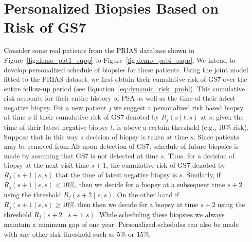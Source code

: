 \section{Personalized Biopsies Based on Risk of GS7}
Consider some real patients from the PRIAS database shown in Figure~\ref{fig:demo_pat1_supp} to Figure~\ref{fig:demo_pat4_supp}. We intend to develop personalized schedule of biopsies for these patients. Using the joint model fitted to the PRIAS dataset, we first obtain their cumulative risk of GS7 over the entire follow-up period (see Equation~\ref{eq:dynamic_risk_prob}). This cumulative risk accounts for their entire history of PSA as well as the time of their latest negative biopsy. For a new patient $j$ we suggest a personalized risk based biopsy at time $s$ if their cumulative risk of GS7 denoted by $R_j(s \mid t, s)$ at $s$, given the time of their latest negative biopsy $t$, is above a certain threshold (e.g., 10\% risk). Suppose that in this way a decision of biopsy is taken at time $s$. Since patients may be removed from AS upon detection of GS7, schedule of future biopsies is made by assuming that GS7 is not detected at time $s$. Thus, for a decision of biopsy at the next visit time $s + 1$, the cumulative risk of GS7 denoted by $R_j(s + 1 \mid s, s)$ that the time of latest negative biopsy is $s$. Similarly, if $R_j(s + 1 \mid s, s) < 10\%$, then we decide for a biopsy at a subsequent time $s + 2$ using the threshold $R_j(s + 2 \mid s,s)$. On the other hand if $R_j(s + 1 \mid s, s) \geq 10\%$ then then we decide for a biopsy at time $s + 2$ using the threshold $R_j(s + 2 \mid s + 1, s)$. While scheduling these biopsies we always maintain a minimum gap of one year. Personalized schedules can also be made with any other risk threshold such as 5\% or 15\%.

